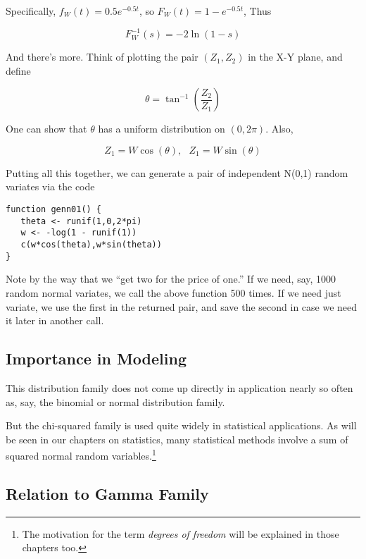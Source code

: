 Specifically, $f_W(t) = 0.5 e^{-0.5t}$, so $F_W(t) = 1 - e^{-0.5t}$,
Thus

\begin{equation}
F_W^{-1}(s) = -2 \ln(1-s)
\end{equation}

And there's more.  Think of plotting the pair $(Z_1,Z_2)$ in the X-Y
plane, and define

\begin{equation}
\theta = \tan^{-1}(\frac{Z_2}{Z_1})
\end{equation}

One can show that $\theta$ has a uniform distribution on
$(0,2\pi)$.  Also, 

\begin{equation}
Z_1 = W\cos(\theta), ~~~ Z_1 = W\sin(\theta)
\end{equation}

Putting all this together, we can generate a pair of independent N(0,1)
random variates via the code

\begin{lstlisting}
function genn01() {
   theta <- runif(1,0,2*pi)
   w <- -log(1 - runif(1))
   c(w*cos(theta),w*sin(theta))
}
\end{lstlisting}

Note by the way that we ``get two for the price of one.''  If we need,
say, 1000 random normal variates, we call the above function 500 times.
If we need just variate, we use the first in the returned pair, and save
the second in case we need it later in another call.

\subsection{Importance in Modeling}

This distribution family does not come up directly in application nearly
so often as, say, the binomial or normal distribution family.

But the chi-squared family is used quite widely in statistical
applications.  As will be seen in our chapters on statistics, many
statistical methods involve a sum of squared normal random
variables.\footnote{The motivation for the term {\it degrees of freedom}
will be explained in those chapters too.}

\subsection{Relation to Gamma Family}


